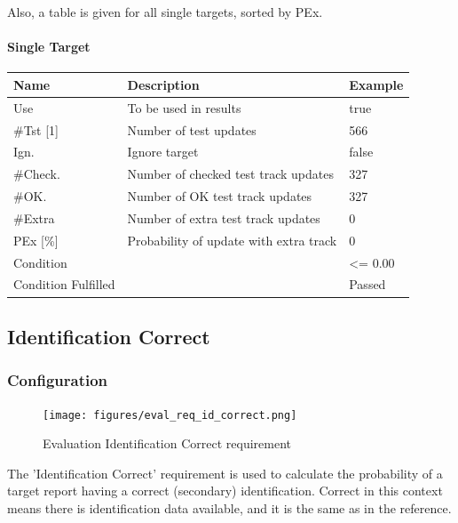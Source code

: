 Also, a table is given for all single targets, sorted by PEx.

\paragraph{Single Target}

\begin{center}
 \begin{table}[H]
  \begin{tabularx}{\textwidth}{ | l | X |  l | }
    \hline
    \textbf{Name} & \textbf{Description} & \textbf{Example} \\ \hline
    Use & To be used in results & true \\ \hline
    \#Tst [1] & Number of test updates & 566 \\ \hline
    Ign. & Ignore target & false \\ \hline
    \#Check. & Number of checked test track updates & 327 \\ \hline
    \#OK. & Number of OK test track updates & 327 \\ \hline
    \#Extra & Number of extra test track updates & 0 \\ \hline
    PEx [\%] & Probability of update with extra track & 0 \\ \hline
    Condition &  & <= 0.00 \\ \hline
    Condition Fulfilled &  & Passed \\ \hline
\end{tabularx}
\end{table}
\end{center}


\subsection{Identification Correct}
\label{sec:eval_req_id_correct} 

\subsubsection{Configuration}

\begin{figure}[H]
    \texttt{[image: figures/eval\_req\_id\_correct.png]}
  \caption{Evaluation Identification Correct requirement}
\end{figure}

The 'Identification Correct' requirement is used to calculate the probability of a target report having a correct (secondary) identification. Correct in this context means there is identification data available, and it is the same as in the reference. \\


